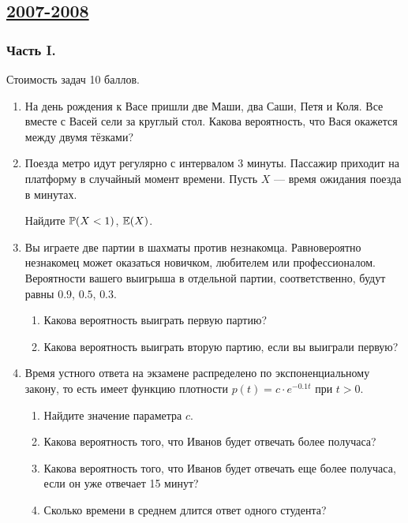 


\newpage
\subsection[2007-2008]{\hyperref[sec:sol_kr_01_2007_2008]{2007-2008}}
\label{sec:kr_01_2007_2008}


\subsubsection*{Часть I.}

Стоимость задач 10 баллов.

\begin{enumerate}
\item На день рождения к Васе пришли две Маши, два Саши, Петя и Коля. Все вместе
с Васей сели за круглый стол. Какова вероятность, что Вася окажется между двумя тёзками?

\item Поезда метро идут регулярно с интервалом 3 минуты. Пассажир приходит на платформу
в случайный момент времени. Пусть $X$ — время ожидания поезда в минутах.

Найдите $\P(X<1)$, $\E(X)$.


\item Вы играете две партии в шахматы против незнакомца. Равновероятно незнакомец
может оказаться новичком, любителем или профессионалом. Вероятности вашего выигрыша
в отдельной партии, соответственно, будут равны $0.9$, $0.5$, $0.3$.
\begin{enumerate}
\item Какова вероятность выиграть первую партию?
\item Какова вероятность выиграть вторую партию, если вы выиграли первую?
\end{enumerate}

\item Время устного ответа на экзамене распределено по экспоненциальному закону,
то есть имеет функцию плотности $p(t) = c \cdot e^{-0.1t}$ при $t>0$.
\begin{enumerate}
\item Найдите значение параметра $c$.
\item Какова вероятность того, что Иванов будет отвечать более получаса?
\item Какова вероятность того, что Иванов будет отвечать еще более получаса,
если он уже отвечает 15 минут?
\item Сколько времени в среднем длится ответ одного студента?
\end{enumerate}


\end{enumerate}
